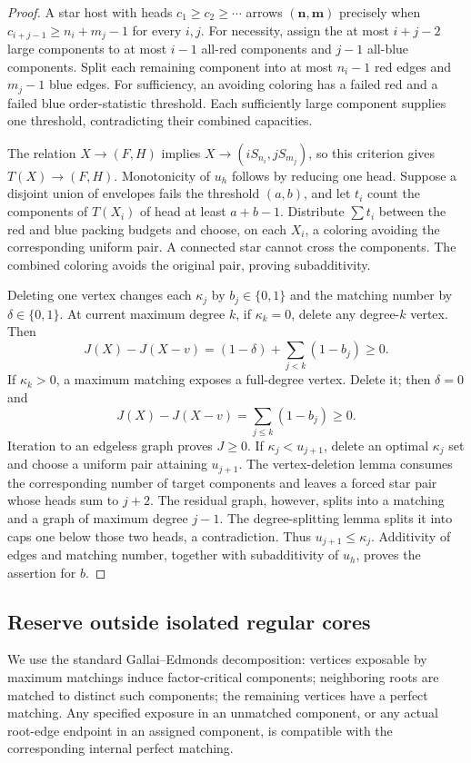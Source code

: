 \documentclass[11pt,a4paper]{article}
\newcommand{\nn}{\mathbf n}\newcommand{\mm}{\mathbf m}
\theoremstyle{definition}
\begin{document}
\begin{proof}
A star host with heads $c_1\ge c_2\ge\cdots$ arrows $(\nn,\mm)$ precisely when $c_{i+j-1}\ge n_i+m_j-1$ for every $i,j$. For necessity, assign the at most $i+j-2$ large components to at most $i-1$ all-red components and $j-1$ all-blue components. Split each remaining component into at most $n_i-1$ red edges and $m_j-1$ blue edges. For sufficiency, an avoiding coloring has a failed red and a failed blue order-statistic threshold. Each sufficiently large component supplies one threshold, contradicting their combined capacities.

The relation $X\to(F,H)$ implies $X\to(iS_{n_i},jS_{m_j})$, so this criterion gives $T(X)\to(F,H)$. Monotonicity of $u_h$ follows by reducing one head. Suppose a disjoint union of envelopes fails the threshold $(a,b)$, and let $t_i$ count the components of $T(X_i)$ of head at least $a+b-1$. Distribute $\sum t_i$ between the red and blue packing budgets and choose, on each $X_i$, a coloring avoiding the corresponding uniform pair. A connected star cannot cross the components. The combined coloring avoids the original pair, proving subadditivity.

Deleting one vertex changes each $\kappa_j$ by $b_j\in\{0,1\}$ and the matching number by $\delta\in\{0,1\}$. At current maximum degree $k$, if $\kappa_k=0$, delete any degree-$k$ vertex. Then
\[
J(X)-J(X-v)=(1-\delta)+\sum_{j<k}(1-b_j)\ge0.
\]
If $\kappa_k>0$, a maximum matching exposes a full-degree vertex. Delete it; then $\delta=0$ and
\[
J(X)-J(X-v)=\sum_{j\le k}(1-b_j)\ge0.
\]
Iteration to an edgeless graph proves $J\ge0$.
If $\kappa_j<u_{j+1}$, delete an optimal $\kappa_j$ set and choose a uniform pair attaining $u_{j+1}$. The vertex-deletion lemma consumes the corresponding number of target components and leaves a forced star pair whose heads sum to $j+2$. The residual graph, however, splits into a matching and a graph of maximum degree $j-1$. The degree-splitting lemma splits it into caps one below those two heads, a contradiction. Thus $u_{j+1}\le\kappa_j$. Additivity of edges and matching number, together with subadditivity of $u_h$, proves the assertion for $b$.
\end{proof}

\subsection{Reserve outside isolated regular cores}
We use the standard Gallai--Edmonds decomposition: vertices exposable by maximum matchings induce factor-critical components; neighboring roots are matched to distinct such components; the remaining vertices have a perfect matching. Any specified exposure in an unmatched component, or any actual root-edge endpoint in an assigned component, is compatible with the corresponding internal perfect matching.
\end{document}

